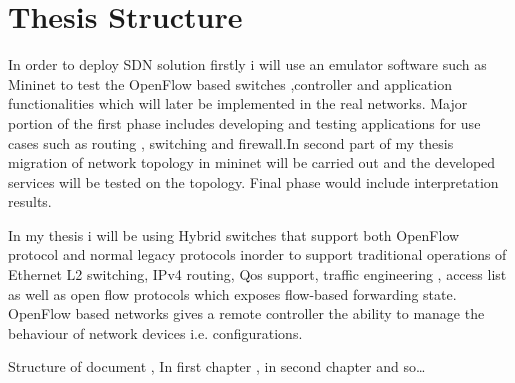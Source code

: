 \section{Thesis Structure}
\label{ch:Introduction:sec:Thesis Structure}
In order to deploy SDN solution firstly i will use an emulator software such as Mininet to test the OpenFlow based switches ,controller and application functionalities which will later be implemented in the real networks. Major portion of the first  phase includes developing and testing applications for  use cases such as routing , switching and firewall.In second part of my thesis migration of network topology in mininet will be carried out and the developed services will be tested on the topology. Final phase would include interpretation results.  
 
In my thesis i will be using Hybrid switches that support both OpenFlow protocol and normal legacy protocols inorder to support traditional operations of Ethernet L2 switching, IPv4 routing, Qos support, traffic engineering , access list as well as open flow protocols which exposes flow-based forwarding state.     
OpenFlow based networks gives a remote controller the ability to manage the behaviour of network devices i.e. configurations.

Structure of document , In first chapter , in second chapter and so\ldots
